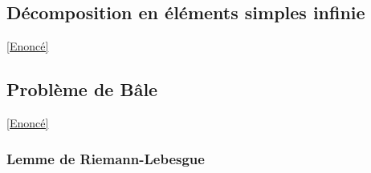 \documentclass{book}
\begin{document}
	\subsection{Décomposition en éléments simples infinie}
	\label{Décomposition en éléments simples infinie corrigé}
	\textcolor{blue}{\hyperref[Décomposition en éléments simples infinie]{[Enoncé]}}\\
	
	\subsection{Problème de Bâle}
	\label{sec:probleme-de-bale}
	\textcolor{blue}{\hyperref[Problème de Bâle]{[Enoncé]}}
	
	\subsubsection{Lemme de Riemann-Lebesgue}
\end{document}
